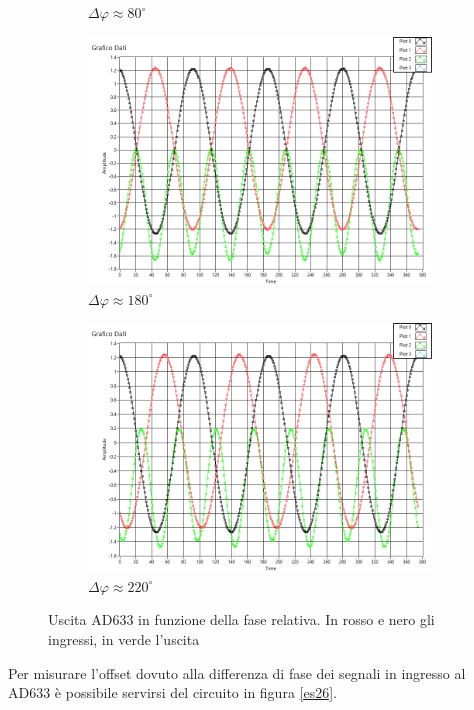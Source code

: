 \documentclass[a4paper]{article}
\begin{document}
\begin{figure}[!h]
\begin{subfigure}[b]{0.45\textwidth}
        \caption{$\Delta \varphi \approx 80^{\circ}$}
        \label{fig:mouse}
    \end{subfigure}
    \begin{subfigure}[b]{0.45\textwidth}
        \includegraphics[width=\textwidth]{es24_circa180grad}
        \caption{$\Delta \varphi \approx 180^{\circ}$}
        \label{fig:mouse}
    \end{subfigure}
    \quad
   \begin{subfigure}[b]{0.45\textwidth}
        \includegraphics[width=\textwidth]{es24_circa220grad}
        \caption{$\Delta \varphi \approx 220^{\circ}$}
        \label{fig:gull}
    \end{subfigure}
    \caption{Uscita AD633 in funzione della fase relativa. In rosso e nero gli ingressi, in verde l'uscita}
    \label{subfig2}
\end{figure}
Per misurare l'offset dovuto alla differenza di fase dei segnali in ingresso al AD633 è possibile servirsi del circuito in figura \ref{es26}.
\end{document}
